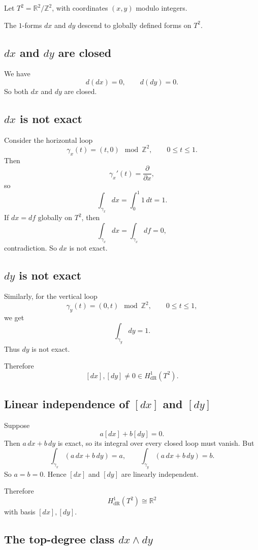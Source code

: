 \documentclass[11pt]{article}
\begin{document}
	Let \(T^2=\mathbb{R}^2/\mathbb{Z}^2\), with coordinates \((x,y)\) modulo integers.
	
	The \(1\)-forms \(dx\) and \(dy\) descend to globally defined forms on \(T^2\).
	
	\subsection*{\(dx\) and \(dy\) are closed}
	
	We have
	\[
	d(dx)=0,
	\qquad
	d(dy)=0.
	\]
	So both \(dx\) and \(dy\) are closed.
	
	\subsection*{\(dx\) is not exact}
	
	Consider the horizontal loop
	\[
	\gamma_x(t)=(t,0)\!\!\!\mod \mathbb{Z}^2,
	\qquad 0\le t\le 1.
	\]
	Then
	\[
	\gamma_x'(t)=\frac{\partial}{\partial x},
	\]
	so
	\[
	\int_{\gamma_x} dx = \int_0^1 1\,dt = 1.
	\]
	If \(dx=df\) globally on \(T^2\), then
	\[
	\int_{\gamma_x}dx=\int_{\gamma_x}df=0,
	\]
	contradiction. So \(dx\) is not exact.
	
	\subsection*{\(dy\) is not exact}
	
	Similarly, for the vertical loop
	\[
	\gamma_y(t)=(0,t)\!\!\!\mod \mathbb{Z}^2,
	\qquad 0\le t\le 1,
	\]
	we get
	\[
	\int_{\gamma_y}dy=1.
	\]
	Thus \(dy\) is not exact.
	
	Therefore
	\[
	[dx],[dy]\neq 0\in H^1_{\mathrm{dR}}(T^2).
	\]
	
	\subsection*{Linear independence of \([dx]\) and \([dy]\)}
	
	Suppose
	\[
	a[dx]+b[dy]=0.
	\]
	Then \(a\,dx+b\,dy\) is exact, so its integral over every closed loop must vanish. But
	\[
	\int_{\gamma_x}(a\,dx+b\,dy)=a,
	\qquad
	\int_{\gamma_y}(a\,dx+b\,dy)=b.
	\]
	So \(a=b=0\). Hence \([dx]\) and \([dy]\) are linearly independent.
	
	Therefore
	\[
	H^1_{\mathrm{dR}}(T^2)\cong \mathbb{R}^2
	\]
	with basis \([dx],[dy]\).
	
	\subsection*{The top-degree class \(dx\wedge dy\)}
	
\end{document}
